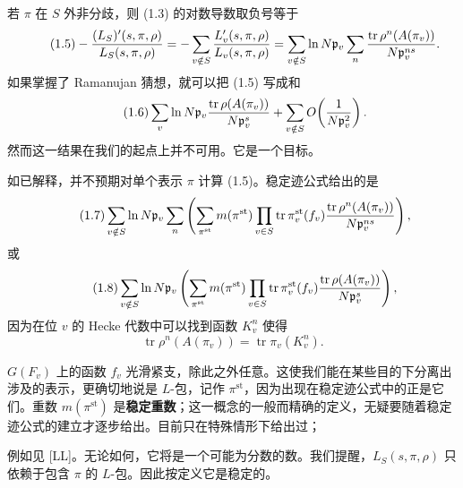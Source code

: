 若 $\pi$ 在 $S$ 外非分歧，则 (1.3) 的对数导数取负号等于
\begin{equation}\tag{1.5}
-\frac{(L_S)'(s,\pi,\rho)}{L_S(s,\pi,\rho)}
=-\sum_{v\notin S}\frac{L'_v(s,\pi,\rho)}{L_v(s,\pi,\rho)}
=\sum_{v\notin S}\ln N\mathfrak{p}_v\sum_n\frac{\operatorname{tr}\rho^n(A(\pi_v))}{N\mathfrak{p}_v^{ns}}.
\end{equation}
如果掌握了 Ramanujan 猜想，就可以把 (1.5) 写成和
\begin{equation}\tag{1.6}
\sum_v\ln N\mathfrak{p}_v\frac{\operatorname{tr}\rho(A(\pi_v))}{N\mathfrak{p}_v^s}
+\sum_{v\notin S}O\!\left(\frac{1}{N\mathfrak{p}_v^{2}}\right).
\end{equation}
然而这一结果在我们的起点上并不可用。它是一个目标。

如已解释，并不预期对单个表示 $\pi$ 计算 (1.5)。稳定迹公式给出的是
\begin{equation}\tag{1.7}
\sum_{v\notin S}\ln N\mathfrak{p}_v\sum_n\left(\sum_{\pi^{\mathrm{st}}}m(\pi^{\mathrm{st}})
\prod_{v\in S}\operatorname{tr}\pi^{\mathrm{st}}_v(f_v)
\frac{\operatorname{tr}\rho^n(A(\pi_v))}{N\mathfrak{p}_v^{ns}}\right),
\end{equation}
或
\begin{equation}\tag{1.8}
\sum_{v\notin S}\ln N\mathfrak{p}_v\left(\sum_{\pi^{\mathrm{st}}}m(\pi^{\mathrm{st}})
\prod_{v\in S}\operatorname{tr}\pi^{\mathrm{st}}_v(f_v)
\frac{\operatorname{tr}\rho(A(\pi_v))}{N\mathfrak{p}_v^{s}}\right),
\end{equation}
因为在位 $v$ 的 Hecke 代数中可以找到函数 $K^n_v$ 使得
\[
\operatorname{tr}\rho^n(A(\pi_v))=\operatorname{tr}\pi_v(K^n_v).
\]

$G(F_v)$ 上的函数 $f_v$ 光滑紧支，除此之外任意。这使我们能在某些目的下分离出涉及的表示，更确切地说是 $L$-包，记作 $\pi^{\mathrm{st}}$，因为出现在稳定迹公式中的正是它们。重数 $m(\pi^{\mathrm{st}})$ 是\textbf{稳定重数}；这一概念的一般而精确的定义，无疑要随着稳定迹公式的建立才逐步给出。目前只在特殊情形下给出过；

例如见 [LL]。无论如何，它将是一个可能为分数的数。我们提醒，$L_S(s,\pi,\rho)$ 只依赖于包含 $\pi$ 的 $L$-包。因此按定义它是稳定的。


